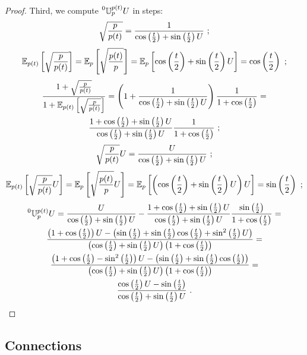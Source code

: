 \documentclass[12pt,a4paper]{amsart}
\begin{document}
\begin{proof}
Third, we compute $\prescript{0}{}{\mathbb U}_{p}^{p(t)} U$ in steps:
%
\begin{equation*}
  \sqrt{\frac{p}{p(t)}} = \frac1{\cos\left(\frac t2\right)+\sin\left(\frac t2\right) U} \ ;
\end{equation*}
%
\begin{equation*}
  {\operatorname{\mathbb E}}_{p(t)}\left[\sqrt{\frac{p}{p(t)}}\right] =  {\operatorname{\mathbb E}}_{p}\left[\sqrt{\frac{p(t)}{p}}\right] = {\operatorname{\mathbb E}}_{p}\left[\cos\left(\frac t2\right)+\sin\left(\frac t2\right) U\right] = \cos\left(\frac t2\right) \ ; 
\end{equation*}
%
\begin{multline*}
  \frac{1+\sqrt{\frac{p}{p(t)}}}{1+{\operatorname{\mathbb E}}_{p(t)}\left[\sqrt{\frac{p}{p(t)}}\right]} = \left(1+\frac1{\cos\left(\frac t2\right)+\sin\left(\frac t2\right) U}\right) \frac1{1+\cos\left(\frac t2\right)} = \\ \frac{1+\cos\left(\frac t2\right)+\sin\left(\frac t2\right) U}{\cos\left(\frac t2\right)+\sin\left(\frac t2\right) U} \frac1{1+\cos\left(\frac t2\right)} \ ;
\end{multline*}
%
\begin{equation*}
  \sqrt{\frac{p}{p(t)}}U = \frac{U}{\cos\left(\frac t2\right)+\sin\left(\frac t2\right) U} \ ;
\end{equation*}
%
\begin{equation*}
  \expectat {p(t)} {\sqrt{\frac{p}{p(t)}}U} =   \expectat {p} {\sqrt{\frac{p(t)}{p}}U} = \expectat p {\left(\cosof{\frac t2}+\sinof{\frac t2} U\right)U} = \sinof{\frac t2} \ ;
\end{equation*}
%
\begin{multline*}
  \prescript{0}{}{\mathbb U}_{p}^{p(t)} U =
  \frac{U}{\cos\left(\frac t2\right)+\sin\left(\frac t2\right) U} - \frac{1+\cos\left(\frac t2\right)+\sin\left(\frac t2\right) U}{\cos\left(\frac t2\right)+\sin\left(\frac t2\right) U} \frac{\sin\left(\frac t2\right)}{1+\cos\left(\frac t2\right)} = \\ \frac{\left(1+\cos\left(\frac t2\right)\right)U - \left(\sin\left(\frac t2\right) + \sin\left(\frac t2\right)\cos\left(\frac t2\right)+\sin^2\left(\frac t2\right) U\right)}{\left(\cos\left(\frac t2\right)+\sin\left(\frac t2\right) U\right)\left(1+\cos\left(\frac t2\right)\right)} = \\ \frac{\left(1+\cos\left(\frac t2\right) - \sin^2\left(\frac t2\right)\right)U - \left(\sin\left(\frac t2\right) + \sin\left(\frac t2\right)\cos\left(\frac t2\right) \right)}{\left(\cos\left(\frac t2\right)+\sin\left(\frac t2\right) U\right)\left(1+\cos\left(\frac t2\right)\right)} = \\ \frac{\cos\left(\frac t2\right)U - \sin\left(\frac t2\right)}{\cos\left(\frac t2\right)+\sin\left(\frac t2\right) U} \ . 
\end{multline*}
  \end{proof}

\subsection{Connections}
\label{sec:connections}
\end{document}
